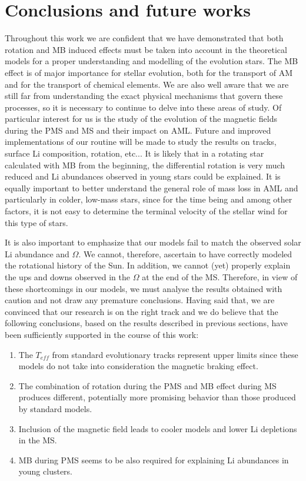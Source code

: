 \documentclass[fleqn,usenatbib]{mnras}
\begin{document}
\section{Conclusions and future works}
Throughout this work we are confident that we have demonstrated that both rotation and MB induced effects must be taken into account in the theoretical models for a proper understanding and modelling of the evolution stars. The MB effect is of major importance for stellar evolution, both for the transport of AM and for the transport of chemical elements. We are also well aware that we are still far from understanding the exact physical mechanisms that govern these processes, so it is necessary to continue to delve into these areas of study. Of particular interest for us is the study of the evolution of the magnetic fields during the PMS and MS and their impact on AML. Future and improved implementations of our routine will be made to study the results on tracks, surface Li composition, rotation, etc... It is likely that in a rotating star calculated with MB from the beginning, the differential rotation is very much reduced and Li abundances observed in young stars could be explained. It is equally important to better understand the general role of mass loss in AML and particularly in colder, low-mass stars, since for the time being and among other factors, it is not easy to determine the terminal velocity of the stellar wind for this type of stars.\par

It is also important to emphasize that our models fail to match the observed solar Li abundance and $\Omega$. We cannot, therefore, ascertain to have correctly modeled the rotational history of the Sun. In addition, we cannot (yet) properly explain the ups and downs observed in the $\Omega$ at the end of the MS. Therefore, in view of these shortcomings in our models, we must analyse the results obtained with caution and not draw any premature conclusions. Having said that, we are convinced that our research is on the right track and we do believe that the following conclusions, based on the results described in previous sections, have been sufficiently supported in the course of this work:
\begin{enumerate}
    \item The $T_{eff}$ from standard evolutionary tracks represent upper limits since these models do not take into consideration the magnetic braking effect.
    \item The combination of rotation during the PMS and MB effect during MS produces different, potentially more promising behavior than those produced by standard models.
    \item Inclusion of the magnetic field leads to cooler models and lower Li depletions in the MS.
    \item MB during PMS seems to be also required for explaining Li abundances in young clusters.
\end{enumerate}
\end{document}
